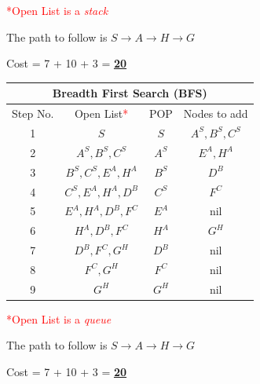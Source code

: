 \documentclass[12pt, letterpaper]{article}
\begin{document}
\textcolor{red}{*Open List is a \textit{stack}}

The path to follow is $S\rightarrow A\rightarrow H\rightarrow G$

Cost = 7 + 10 + 3 = \underline{\textbf{20}}

\begin{center}
    \begin{tabular}{|c|c|c|c|}
    \hline
    \multicolumn{4}{|c|}{Breadth First Search (\textbf{BFS})}\\
    \hline
    Step No. & Open List\textcolor{red}{*} & POP & Nodes to add \\ 
    \hline
    1 & $S$ & $S$ & $A^S, B^S, C^S$ \\
    \hline
    2 & $A^S, B^S, C^S$ & $A^S$ & $E^A,H^A$ \\
    \hline
    3 & $B^S, C^S, E^A, H^A$ & $B^S$ & $D^B$ \\
    \hline
    4 & $C^S, E^A, H^A, D^B$ & $C^S$ & $F^C$ \\
    \hline
    5 & $E^A,H^A,D^B,F^C$ & $E^A$ & nil \\
    \hline
    6 & $H^A,D^B,F^C$ & $H^A$  & $G^H$ \\
    \hline
    7 & $D^B,F^C,G^H$ & $D^B$  & nil \\
    \hline
    8 & $F^C,G^H$ & $F^C$  & nil \\
    \hline
    9 & $G^H$ & $G^H$  & nil \\
    \hline
    \end{tabular}
\end{center}

\textcolor{red}{*Open List is a \textit{queue}}

The path to follow is $S\rightarrow A\rightarrow H\rightarrow G$

Cost = 7 + 10 + 3 = \underline{\textbf{20}}
\end{document}
